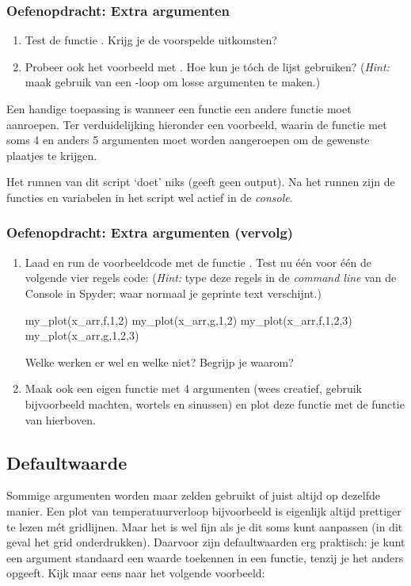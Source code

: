\documentclass[a4paper,11pt, fleqn]{article}
\begin{document}
\subsubsection*{Oefenopdracht: Extra argumenten}
\begin{enumerate}[label=(\alph*)]
\item Test de functie . Krijg je de voorspelde uitkomsten?
\item Probeer ook het voorbeeld met . Hoe kun je t\'och de lijst gebruiken? (\textit{Hint:} maak gebruik van een -loop om losse argumenten te maken.)
\end{enumerate}

Een handige toepassing is wanneer een functie een andere functie moet aanroepen. Ter verduidelijking hieronder een voorbeeld, waarin de functie  met soms 4 en anders 5 argumenten moet worden aangeroepen om de gewenste plaatjes te krijgen.


Het runnen van dit script `doet' niks (geeft geen output). Na het runnen zijn de functies en variabelen in het script wel actief in de \textit{console}.

\subsubsection*{Oefenopdracht: Extra argumenten (vervolg)}
\begin{enumerate}[label=(\alph*), resume]
\item Laad en run de voorbeeldcode met de functie . Test nu \'e\'en voor \'e\'en de volgende vier regels code: (\textit{Hint:} type deze regels in de \textit{command line} van de Console in Spyder; waar normaal je geprinte text verschijnt.)
\begin{python}
my_plot(x_arr,f,1,2)
my_plot(x_arr,g,1,2)
my_plot(x_arr,f,1,2,3)
my_plot(x_arr,g,1,2,3)
\end{python}
Welke werken er wel en welke niet? Begrijp je waarom?
\item Maak ook een eigen functie met 4 argumenten (wees creatief, gebruik bijvoorbeeld machten, wortels en sinussen) en plot deze functie met de  functie van hierboven.
\end{enumerate}

\subsection{Defaultwaarde}
Sommige argumenten worden maar zelden gebruikt of juist altijd op dezelfde manier. Een plot van temperatuurverloop bijvoorbeeld is eigenlijk altijd prettiger te lezen m\'et gridlijnen. Maar het is wel fijn als je dit soms kunt aanpassen (in dit geval het grid onderdrukken). Daarvoor zijn defaultwaarden erg praktisch: je kunt een argument standaard een waarde toekennen in een functie, tenzij je het anders opgeeft. Kijk maar eens naar het volgende voorbeeld:
\end{document}
